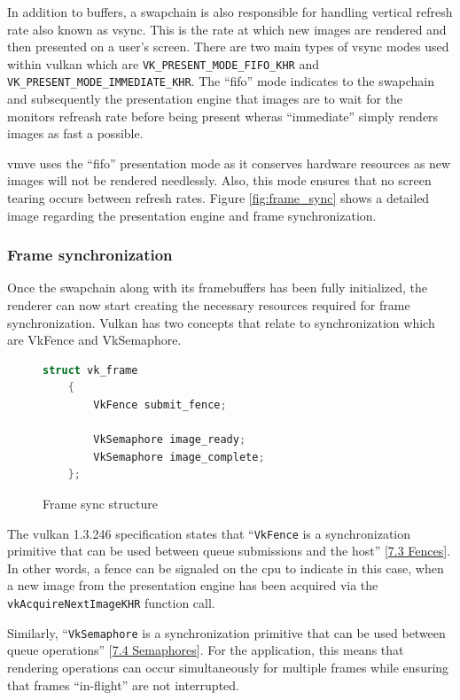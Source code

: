\documentclass[11pt]{article}
\begin{document}
In addition to buffers, a swapchain is also responsible for handling vertical
refresh rate also known as vsync. This is the rate at which new images are
rendered and then presented on a user's screen. There are two main types of
vsync modes used within \gls{vulkan} which are
\lstinline{VK_PRESENT_MODE_FIFO_KHR} and
\lstinline{VK_PRESENT_MODE_IMMEDIATE_KHR}. The ``fifo'' mode indicates to the 
swapchain and subsequently the presentation engine that images are to wait 
for the monitors refreash rate before being present wheras ``immediate'' simply
renders images as fast a possible.

\gls{vmve} uses the ``fifo'' presentation mode as it conserves hardware
resources as new images will not be rendered needlessly. Also, this mode ensures
that no screen tearing occurs between refresh rates. Figure \ref{fig:frame_sync}
shows a detailed image regarding the presentation engine and frame
synchronization.

\subsubsection{Frame synchronization}
Once the swapchain along with its framebuffers has been fully initialized, the
renderer can now start creating the necessary resources required for frame
synchronization. Vulkan has two concepts that relate to synchronization which
are VkFence and VkSemaphore.

\begin{figure}[ht]
  \centering
  \begin{lstlisting}[language=C++]
    struct vk_frame
    {
        VkFence submit_fence;

        VkSemaphore image_ready;
        VkSemaphore image_complete;
    };
  \end{lstlisting}
  \caption{Frame sync structure}
  \label{fig:vk_fence}
\end{figure}

The \gls{vulkan} 1.3.246 specification states that  ``\lstinline{VkFence} is a
synchronization primitive that can be used between queue submissions and the
host''
[\href{https://registry.khronos.org/vulkan/specs/1.3-extensions/man/html/VkFence.html}{7.3
Fences}]. In other words, a fence can be signaled on the \gls{cpu} to indicate
in this case, when a new image from the presentation engine has been acquired
via the \lstinline{vkAcquireNextImageKHR} function call.

Similarly, ``\lstinline{VkSemaphore} is a synchronization primitive that can be
used between queue operations''
[\href{https://registry.khronos.org/vulkan/specs/1.3-extensions/man/html/VkSemaphore.html}{7.4
Semaphores}]. For the application, this means that rendering operations can
occur simultaneously for multiple frames while ensuring that frames
``in-flight'' are not interrupted.
\end{document}
